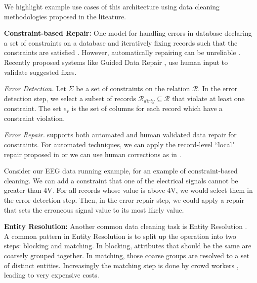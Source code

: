 \noindent We highlight example use cases of this architecture using data cleaning methodologies proposed in the liteature.

\vspace{0.5em}

\noindent\textbf{Constraint-based Repair: }
One model for handling errors in database declaring a set of constraints on a database and 
iteratively fixing records such that the constraints are satisfied \cite{DBLP:journals/pvldb/YakoutENOI11, DBLP:journals/pvldb/FanLMTY10, khayyat2015bigdansing}.
However, automatically repairing can be unreliable \cite{DBLP:journals/pvldb/FanLMTY10}.
Recently proposed systems like Guided Data Repair \cite{DBLP:journals/pvldb/YakoutENOI11}, use human input to validate suggested fixes.

\vspace{0.5em}

\emph{Error Detection. } Let $\Sigma$ be a set of constraints on the relation $\mathcal{R}$. 
In the error detection step, we select a subset of records $\mathcal{R}_{dirty} \subseteq \mathcal{R}$ that violate at least one constraint.
The set $e_r$ is the set of columns for each record which have a constraint violation.

\vspace{0.5em}

\emph{Error Repair. } \sys supports both automated and human validated data repair for constraints. For automated techniques, we can apply the record-level ``local" repair proposed in \cite{DBLP:journals/pvldb/FanLMTY10} or we can use human corrections as in \cite{DBLP:journals/pvldb/YakoutENOI11}. 

\begin{example}
Consider our EEG data running example, for an example of constraint-based cleaning.
We can add a constraint that one of the electrical signals cannot be greater than 4V.
For all records whose value is above 4V, we would select them in the error detection step.
Then, in the error repair step, we could apply a repair that sets the erroneous signal value to its most likely value.
\end{example}

\vspace{0.5em}

\noindent\textbf{Entity Resolution: }
Another common data cleaning task is Entity Resolution \cite{gokhale2014corleone, DBLP:journals/pvldb/KopckeTR10, wang2012crowder}.
A common pattern in Entity Resolution is to split up the operation into two steps: blocking and matching.
In blocking, attributes that should be the same are coarsely grouped together.
In matching, those coarse groups are resolved to a set of distinct entities.
Increasingly the matching step is done by crowd workers \cite{wang2012crowder, gokhale2014corleone}, leading to very expensive costs.

